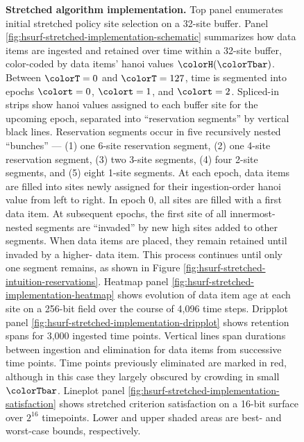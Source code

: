 \begin{figure}[htbp!]
\vspace{-2ex}\caption{%
  \textbf{Stretched algorithm implementation.}
  \footnotesize
  Top panel \label{fig:hsurf-stretched-implementation-site-selection} enumerates initial stretched policy site selection on a 32-site buffer.
  Panel \ref{fig:hsurf-stretched-implementation-schematic} summarizes how data items are ingested and retained over time within a 32-site buffer, color-coded by data items' hanoi values $\colorH(\colorTbar)$.
  Between $\colorT=0$ and $\colorT=127$, time is segmented into epochs $\colort=0$, $\colort=1$, and $\colort=2$.
  Spliced-in strips show hanoi values assigned to each buffer site for the upcoming epoch, separated into ``reservation segments'' by vertical black lines.
  Reservation segments occur in five recursively nested ``bunches'' --- (1) one 6-site reservation segment, (2) one 4-site reservation segment, (3) two 3-site segments, (4) four 2-site segments, and (5) eight 1-site segments.
  At each epoch, data items are filled into sites newly assigned for their ingestion-order hanoi value from left to right.
  In epoch 0, all sites are filled with a first data item.
  At subsequent epochs, the first site of all innermost-nested segments are ``invaded'' by new high \hv{} sites added to other segments.
  When data items are placed, they remain retained until invaded by a higher-\hv{} data item.
  This process continues until only one segment remains, as shown in Figure \ref{fig:hsurf-stretched-intuition-reservations}.
  Heatmap panel \ref{fig:hsurf-stretched-implementation-heatmap} shows evolution of data item age at each site on a 256-bit field over the course of 4,096 time steps.
  Dripplot panel \ref{fig:hsurf-stretched-implementation-dripplot} shows retention spans for 3,000 ingested time points.
  Vertical lines span durations between ingestion and elimination for data items from successive time points.
  Time points previously eliminated are marked in red, although in this case they largely obscured by crowding in small $\colorTbar$.
  Lineplot panel \ref{fig:hsurf-stretched-implementation-satisfaction} shows stretched criterion satisfaction on a 16-bit surface over $2^{16}$ timepoints.
  Lower and upper shaded areas are best- and worst-case bounds, respectively.
  }
\label{fig:hsurf-stretched-implementation}

\end{figure}
